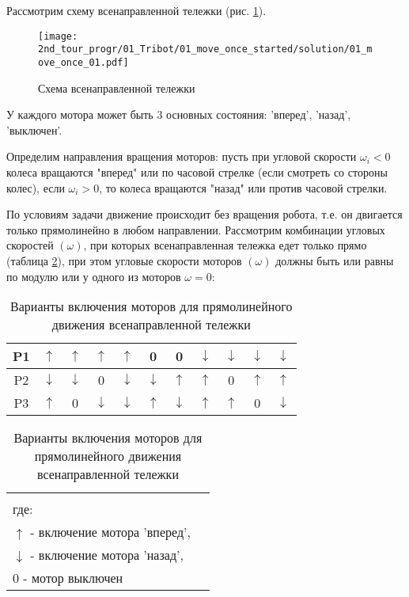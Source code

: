 \solutionSection

Рассмотрим схему всенаправленной тележки (рис. \ref{fig:01_move_once_01}).
\begin{figure}[h!]
	\centering
	\texttt{[image: 2nd\_tour\_progr/01\_Tribot/01\_move\_once\_started/solution/01\_move\_once\_01.pdf]}
	\caption{Схема всенаправленной тележки}
	\label{fig:01_move_once_01}
\end{figure}

У каждого мотора может быть 3 основных состояния: 'вперед', 'назад', 'выключен'.

Определим направления вращения моторов: пусть при угловой скорости $\omega_i < 0$ колеса вращаются "вперед" или по часовой стрелке (если смотреть со стороны колес), если $\omega_i > 0$, то колеса вращаются "назад" или против часовой стрелки.

По условиям задачи движение происходит без вращения робота, т.е. он двигается только прямолинейно в любом направлении. Рассмотрим комбинации угловых скоростей $(\omega)$, при которых всенаправленная тележка едет только прямо (таблица \ref{table:01_move_once_01}), при этом угловые скорости моторов $(\omega)$ должны быть или равны по модулю или у одного из моторов $\omega = 0$:

\begin{table}[h!]
	\begin{center}
	\begin{tabular}{|c|c|c|c|c|c|c|c|c|c|c|}
		\hline
		P1 & $\uparrow$ & $\uparrow$ & $\uparrow$ & $\uparrow$ & 0 & 0 & $\downarrow$ & $\downarrow$ & $\downarrow$ & $\downarrow$ \\
		\hline
		P2 & $\downarrow$ & $\downarrow$ & 0 & $\downarrow$ & $\downarrow$ & $\uparrow$ & $\uparrow$ & 0 & $\uparrow$ & $\uparrow$\\
		\hline
		P3 & $\uparrow$ & 0 & $\downarrow$ & $\downarrow$ & $\uparrow$ & $\downarrow$ & $\uparrow$ & $\uparrow$ & 0 & $\downarrow$\\
		\hline
	\end{tabular}

	\begin{tabular}{c|c|c|c|c|c|c|c|c|c|c|c}
		\multicolumn{11}{c}{} \\
		\multicolumn{11}{l}{где:} \\
		\multicolumn{11}{l}{$\uparrow$ - включение мотора 'вперед',} \\
		\multicolumn{11}{l}{$\downarrow$ - включение мотора 'назад',} \\
		\multicolumn{11}{l}{$0$ - мотор выключен} \\
	\end{tabular} 
	\caption{Варианты включения моторов для прямолинейного движения всенаправленной тележки}
	\label{table:01_move_once_01}
	\end{center}
\end{table}


